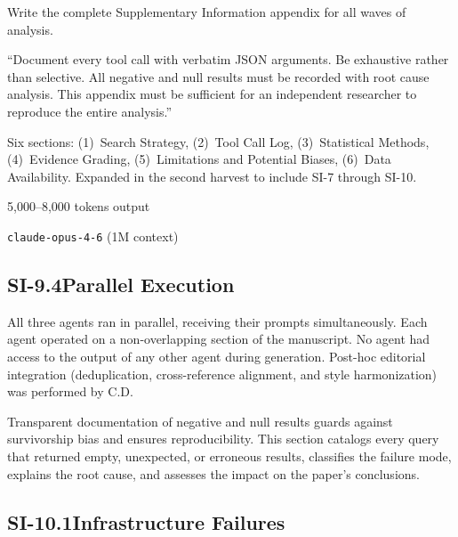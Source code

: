 \begin{description}[style=nextline, nosep]
  \item[Assignment]
    Write the complete Supplementary Information appendix for all waves of
    analysis.
  \item[Key directive]
    ``Document every tool call with verbatim JSON arguments.  Be exhaustive
    rather than selective.  All negative and null results must be recorded
    with root cause analysis.  This appendix must be sufficient for an
    independent researcher to reproduce the entire analysis.''
  \item[Structure specified]
    Six sections: (1)~Search Strategy, (2)~Tool Call Log, (3)~Statistical
    Methods, (4)~Evidence Grading, (5)~Limitations and Potential Biases,
    (6)~Data Availability.  Expanded in the second harvest to include
    SI-7 through SI-10.
  \item[Approximate token budget] 5,000--8,000 tokens output
  \item[Model] \texttt{claude-opus-4-6} (1M context)
\end{description}

\subsection*{SI-9.4\quad Parallel Execution}

All three agents ran in parallel, receiving their prompts simultaneously.
Each agent operated on a non-overlapping section of the manuscript.  No agent
had access to the output of any other agent during generation.  Post-hoc
editorial integration (deduplication, cross-reference alignment, and style
harmonization) was performed by C.D.


Transparent documentation of negative and null results guards against
survivorship bias and ensures reproducibility.  This section catalogs every
query that returned empty, unexpected, or erroneous results, classifies the
failure mode, explains the root cause, and assesses the impact on the paper's
conclusions.

\subsection*{SI-10.1\quad Infrastructure Failures}

